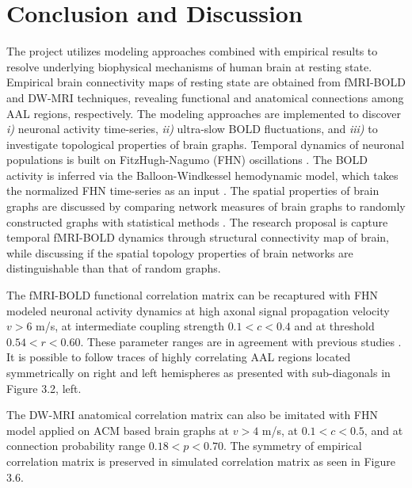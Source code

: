 
\chapter{Conclusion and Discussion}  %

\label{Chapter4} %


The project utilizes modeling approaches combined with empirical results to resolve underlying biophysical mechanisms of human brain at resting state. Empirical brain connectivity maps of resting state are obtained from fMRI-BOLD and DW-MRI techniques, revealing functional and anatomical connections among AAL regions, respectively. The modeling approaches are implemented to discover \textit{i)} neuronal activity time-series, \textit{ii)} ultra-slow BOLD fluctuations, and \textit{iii)} to investigate topological properties of brain graphs. Temporal dynamics of neuronal populations is built on FitzHugh-Nagumo (FHN) oscillations \citep{GHO08, VUK13, DEC09, FIT61}. The BOLD activity is inferred via the Balloon-Windkessel hemodynamic model, which takes the normalized FHN time-series as an input \citep{FRI00, VUK13}. The spatial properties of brain graphs are discussed by comparing network measures of brain graphs to randomly constructed graphs with statistical methods \citep{BUL09, RUB09, NEW10}. The research proposal  is capture temporal fMRI-BOLD dynamics through structural connectivity map of brain, while discussing if the spatial topology properties of brain networks are distinguishable than that of random graphs. 

The fMRI-BOLD functional correlation matrix can be recaptured with FHN modeled neuronal activity dynamics at high axonal signal propagation velocity $v>6$ m/s, at intermediate coupling strength $0.1<c<0.4$ and at threshold $0.54<r<0.60$. These parameter ranges are in agreement with previous studies \citep{VUK13, GHO08a}. It is possible to follow traces of highly correlating AAL regions located symmetrically on right and left hemispheres as presented with sub-diagonals in Figure 3.2, left.  

The DW-MRI anatomical correlation matrix can also be imitated with FHN model applied on ACM based brain graphs at $v>4$ m/s, at $0.1<c<0.5$, and at connection probability range $0.18<p<0.70$. The symmetry of empirical correlation matrix is preserved in simulated correlation matrix as seen in Figure 3.6.

